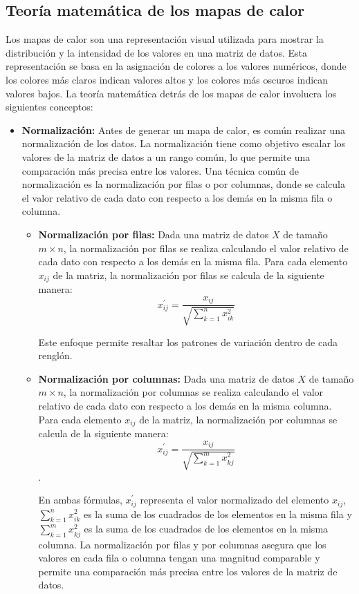 \documentclass{article}
\begin{document}
\subsection{Teoría matemática de los mapas de calor}

Los mapas de calor son una representación visual utilizada para mostrar la distribución y la intensidad de los valores en una matriz de datos. Esta representación se basa en la asignación de colores a los valores numéricos, donde los colores más claros indican valores altos y los colores más oscuros indican valores bajos. La teoría matemática detrás de los mapas de calor involucra los siguientes conceptos:

\begin{itemize}
\item \textbf{Normalización: } Antes de generar un mapa de calor, es común realizar una normalización de los datos. La normalización tiene como objetivo escalar los valores de la matriz de datos a un rango común, lo que permite una comparación más precisa entre los valores. Una técnica común de normalización es la normalización por filas o por columnas, donde se calcula el valor relativo de cada dato con respecto a los demás en la misma fila o columna.
\begin{itemize}
\item \textbf{Normalización por filas:}
Dada una matriz de datos  $X$ de tamaño  $m \times n$,  la normalización por filas se realiza calculando el valor relativo de cada dato con respecto a los demás en la misma fila. Para cada elemento  $x_{ij}$ de la matriz, la normalización por filas se calcula de la siguiente manera: $$x_{ij}^{'} = \frac{x_{ij}}{\sqrt{\sum_{k=1}^{n} x_{ik}^2}}$$

Este enfoque permite resaltar los patrones de variación dentro de cada renglón. 

\item \textbf{Normalización por columnas:}
Dada una matriz de datos  $X$ de tamaño  $m \times n$,   la normalización por columnas se realiza calculando el valor relativo de cada dato con respecto a los demás en la misma columna. Para cada elemento  $x_{ij}$  de la matriz, la normalización por columnas se calcula de la siguiente manera:$$x_{ij}^{'} = \frac{x_{ij}}{\sqrt{\sum_{k=1}^{m} x_{kj}^2}}$$.

En ambas fórmulas, $x_{ij}^{'}$ representa el valor normalizado del elemento $x_{ij}$, $\sum_{k=1}^{n} x_{ik}^2$ es la suma de los cuadrados de los elementos en la misma fila y $\sum_{k=1}^{m} x_{kj}^2$ es la suma de los cuadrados de los elementos en la misma columna. La normalización por filas y por columnas asegura que los valores en cada fila o columna tengan una magnitud comparable y permite una comparación más precisa entre los valores de la matriz de datos.


\end{itemize}
\end{itemize}
\end{document}

